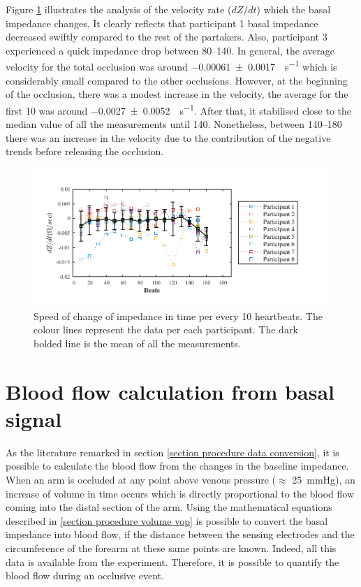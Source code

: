 Figure \ref{fig:total occlusion change} illustrates the analysis of the velocity rate ($dZ/dt$) which the basal impedance changes. It clearly reflects that participant 1 basal impedance decreased swiftly compared to the rest of the partakers. Also, participant 3 experienced a quick impedance drop between \SIrange{80}{140}{\beats}. In general, the average velocity for the total occlusion was around \SI{-0.00061(000170)}{\Omega\per\second} which is considerably small compared to the other occlusions. However, at the beginning of the occlusion, there was a modest increase in the velocity, the average for the first \SI{10}{\beats} was around \SI{-0.0027(00052)}{\Omega\per\second}. After that, it stabilised close to the median value of all the measurements until \SI{140}{\beats}. Nonetheless, between \SIrange{140}{180}{\beats} there was an increase in the velocity due to the contribution of the negative trends before releasing the occlusion. 

\begin{figure}[htbp]
	\centering
	\includegraphics[width=15cm,keepaspectratio]{figure_vop_9}    
	\caption[Rate of change of impedance per 10 heartbeats during total occlusion]{Speed of change of impedance in time per every 10 heartbeats. The colour lines represent the data per each participant. The dark bolded line is the mean of all the measurements.}
	\label{fig:total occlusion change}
\end{figure} 




\section{Blood flow calculation from basal signal}
\label{section occlusion flow basal}
As the literature remarked in section \ref{section procedure data conversion}, it is possible to calculate the blood flow from the changes in the baseline impedance. When an arm is occluded at any point above venous pressure ($\approx$ \SI{25}{\mmHg}), an increase of volume in time occurs which is directly proportional to the blood flow coming into the distal section of the arm. Using the mathematical equations described in \ref{section procedure volume vop} is possible to convert the basal impedance into blood flow, if the distance between the sensing electrodes and the circumference of the forearm at these same points are known. Indeed, all this data is available from the experiment. Therefore, it is possible to quantify the blood flow during an occlusive event.  

